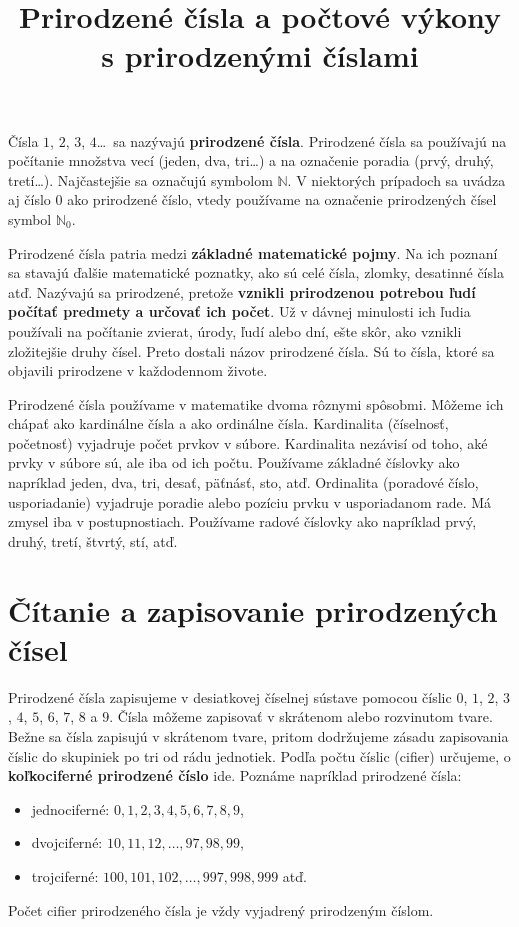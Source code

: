 \documentclass{article}
\title{Prirodzené čísla a počtové výkony s prirodzenými číslami}
\begin{document}
\maketitle

Čísla $1$, $2$, $3$, $4$\dots\ sa nazývajú \textbf{prirodzené čísla}. Prirodzené čísla sa používajú na počítanie množstva vecí (jeden, dva, tri\dots) a na označenie poradia (prvý, druhý, tretí\dots). Najčastejšie sa označujú symbolom $\mathbb{N}$. V niektorých prípadoch sa uvádza aj číslo $0$ ako prirodzené číslo, vtedy používame na označenie prirodzených čísel symbol $\mathbb{N}_0$.

Prirodzené čísla patria medzi \textbf{základné matematické pojmy}. Na ich poznaní sa stavajú ďalšie matematické poznatky, ako sú celé čísla, zlomky, desatinné čísla atď. Nazývajú sa prirodzené, pretože \textbf{vznikli prirodzenou potrebou ľudí počítať predmety a určovať ich počet}. Už v dávnej minulosti ich ľudia používali na počítanie zvierat, úrody, ľudí alebo dní, ešte skôr, ako vznikli zložitejšie druhy čísel. Preto dostali názov prirodzené čísla. Sú to čísla, ktoré sa objavili prirodzene v každodennom živote.

Prirodzené čísla používame v matematike dvoma rôznymi spôsobmi. Môžeme ich chápať ako kardinálne čísla a ako ordinálne čísla. Kardinalita (číselnosť, početnosť) vyjadruje počet prvkov v súbore. Kardinalita nezávisí od toho, aké prvky v súbore sú, ale iba od ich počtu. Používame základné číslovky ako napríklad jeden, dva, tri, desať, päťnásť, sto, atď. Ordinalita (poradové číslo, usporiadanie) vyjadruje poradie alebo pozíciu prvku v usporiadanom rade. Má zmysel iba v postupnostiach. Používame radové číslovky ako napríklad prvý, druhý, tretí, štvrtý, stí, atď.

\section{Čítanie a zapisovanie prirodzených čísel}

Prirodzené čísla zapisujeme v desiatkovej číselnej sústave pomocou číslic \(0\), \(1\), \(2\), \(3\), \(4\), \(5\), \(6\), \(7\), \(8\) a \(9\). Čísla môžeme zapisovať v skrátenom alebo rozvinutom tvare. Bežne sa čísla zapisujú v skrátenom tvare, pritom dodržujeme zásadu zapisovania číslic do skupiniek po tri od rádu jednotiek. Podľa počtu číslic (cifier) určujeme, o \textbf{koľkociferné prirodzené číslo} ide. Poznáme napríklad prirodzené čísla:
\begin{itemize}
  \item jednociferné: \(0, 1, 2, 3, 4, 5, 6, 7, 8, 9\),
  \item dvojciferné: \(10, 11, 12, \dots, 97, 98, 99\),
  \item trojciferné: \(100, 101, 102, \dots, 997, 998, 999\) atď.
\end{itemize}
Počet cifier prirodzeného čísla je vždy vyjadrený prirodzeným číslom.
\end{document}
